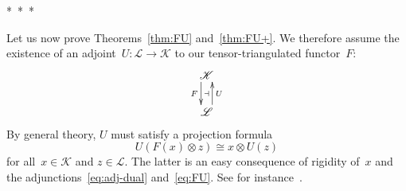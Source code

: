 \documentclass{amsart}
\numberwithin{equation}{section}
\theoremstyle{remark}
\begin{document}
\begin{center}*\ *\ *\end{center}

Let us now prove Theorems~\ref{thm:FU} and~\ref{thm:FU+}. We therefore assume the existence of an adjoint~$U\colon {\mathscr{{L}}}\to {\mathscr{{K}}}$ to our tensor-triangulated functor~$F$:
\begin{equation}
\label{eq:FU}\vcenter{\xymatrix@R=2em{
{\mathscr{{K}}} \ar@<-.5em>[d]_-{F} \ar@{}[d]|-{\dashv}
\\
{\mathscr{{L}}} \ar@<-.5em>[u]_-{U}
}}
\end{equation}
By general theory, $U$ must satisfy a projection formula
\begin{equation}
\label{eq:proj-form}U(F(x)\otimes z)\cong x\otimes U(z)
\end{equation}
for all~$x\in{\mathscr{{K}}}$ and $z\in{\mathscr{{L}}}$. The latter is an easy consequence of rigidity of~$x$ and the adjunctions~\eqref{eq:adj-dual} and~\eqref{eq:FU}. See for instance~\cite[Prop.\,3.2]{FauskHuMay03}.
\end{document}
